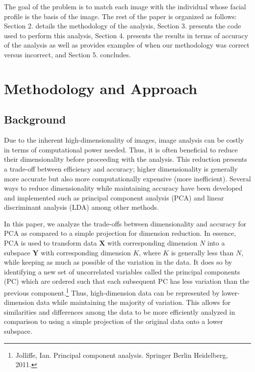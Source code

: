 \documentclass[12pt]{article}
\begin{document}
	The goal of the problem is to match each image with the individual whose facial profile is the basis of the image. 
	The rest of the paper is organized as follows: Section 2. details the methodology of the analysis, Section 3. presents the code used to perform this analysis, Section 4. presents the results in terms of accuracy of the analysis as well as provides examples of when our methodology was correct versus incorrect, and Section 5. concludes. 
	
\section{Methodology and Approach}

	\subsection{Background}
	Due to the inherent high-dimensionality of images, image analysis can be costly in terms of computational power needed. Thus, it is often beneficial to reduce their dimensionality before proceeding with the analysis. This reduction presents a trade-off between efficiency and accuracy; higher dimensionality is generally more accurate but also more computationally expensive (more inefficient). Several ways to reduce dimensionality while maintaining accuracy have been developed and implemented such as principal component analysis (PCA) and linear discriminant analysis (LDA) among other methods.
   
   In this paper, we analyze the trade-offs between dimensionality and accuracy for PCA as compared to a  simple projection for dimension reduction. In essence, PCA is used to transform data $ \mathbf{X} $ with corresponding dimension $ N $ into a subspace $ \mathbf{Y} $ with corresponding dimension $ K $, where $ K $ is generally less than $ N $, while keeping as much as possible of the variation in the data. It does so by identifying a new set of uncorrelated variables called the principal components (PC) which are ordered such that each subsequent PC has less variation than the previous component.\footnote{Jolliffe, Ian. Principal component analysis. Springer Berlin Heidelberg, 2011.} Thus, high-dimension data can be represented by lower-dimension data while maintaining the majority of variation. This allows for similarities and differences among the data to be more efficiently analyzed in comparison to using  a simple projection of the original data onto a lower subspace.
   
   
\end{document}
